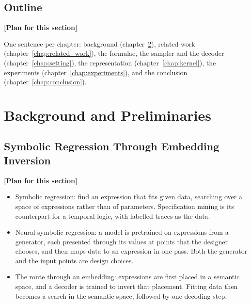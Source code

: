 \documentclass[titlepage,a4paper,11pt]{report}
\newenvironment{RSplan}{\par\medskip\color{orange!85!black}\noindent\textbf{[Plan for this section]}\par}{\par\medskip}
\begin{document}
    \section{Outline}\label{sec:intro_outline}
    \begin{RSplan}
    One sentence per chapter: background (chapter~\ref{chap:background}), related work (chapter~\ref{chap:related_work}), the formulae, the sampler and the decoder (chapter~\ref{chap:setting}), the representation (chapter~\ref{chap:kernel}), the experiments (chapter~\ref{chap:experiments}), and the conclusion (chapter~\ref{chap:conclusion}).
    \end{RSplan}


\chapter{Background and Preliminaries}\label{chap:background}
    \section{Symbolic Regression Through Embedding Inversion}\label{sec:symbolic_regression}
    \begin{RSplan}
    \begin{itemize}
        \item Symbolic regression: find an expression that fits given data, searching over a space of expressions rather than of parameters. Specification mining is its counterpart for a temporal logic, with labelled traces as the data.
        \item Neural symbolic regression: a model is pretrained on expressions from a generator, each presented through its values at points that the designer chooses, and then maps data to an expression in one pass. Both the generator and the input points are design choices.
        \item The route through an embedding: expressions are first placed in a semantic space, and a decoder is trained to invert that placement. Fitting data then becomes a search in the semantic space, followed by one decoding step.
    \end{itemize}
    \end{RSplan}
\end{document}
